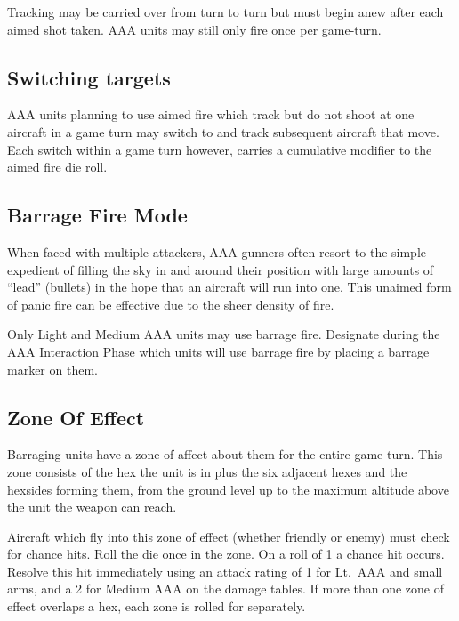 Tracking may be carried over from turn to turn but must begin anew after each aimed shot taken. AAA units may still only fire once per game-turn.

\subsection{Switching targets} AAA units planning to use aimed fire which track but do not shoot at one aircraft in a game turn may switch to and track subsequent aircraft that move. Each switch within a game turn however, carries a cumulative  modifier to the aimed fire die roll.

\subsection{Barrage Fire Mode}



When faced with multiple attackers, AAA gunners often resort to the simple expedient of filling the sky in and around their position with large amounts of “lead” (bullets) in the hope that an aircraft will run into one. This unaimed form of panic fire can be effective due to the sheer density of fire.

Only Light and Medium AAA units may use barrage fire. Designate during the AAA Interaction Phase which units will use barrage fire by placing a barrage marker on them.

\subsection{Zone Of Effect} Barraging units have a zone of affect about them for the entire game turn. This zone consists of the hex the unit is in plus the six adjacent hexes and the hexsides forming them, from the ground level up to the maximum altitude above the unit the weapon can reach.

Aircraft which fly into this zone of effect (whether friendly or enemy) must check for chance hits. Roll the die once  in the zone. On a roll of 1 a chance hit occurs. Resolve this hit immediately using an attack rating of 1 for Lt.\ AAA and small arms, and a 2 for Medium AAA on the damage tables. If more than one zone of effect overlaps a hex, each zone is rolled for separately.

